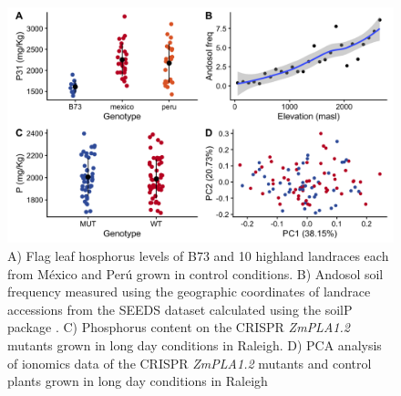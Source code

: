 \documentclass[9pt,twocolumn,twoside]{BioRxiv}
\begin{document}
\begin{figure}[t]
\begin{center}
\includegraphics[width=0.8\paperwidth]{Sup_Figures/Sup_Fig_8.png}
\caption{A) Flag leaf hosphorus levels of B73 and 10 highland landraces each from México and Perú grown in control conditions.
B) Andosol soil frequency measured using the geographic coordinates of landrace accessions from the SEEDS dataset calculated using the soilP package \cite{Rodriguez-Zapata2018-vz}.
C) Phosphorus content on the CRISPR \textit{ZmPLA1.2} mutants grown in long day conditions in Raleigh.
D) PCA analysis of ionomics data of the CRISPR \textit{ZmPLA1.2} mutants and control plants grown in long day conditions in Raleigh
}
\label{SupFig8}
\end{center}
\end{figure} 
\end{document}
